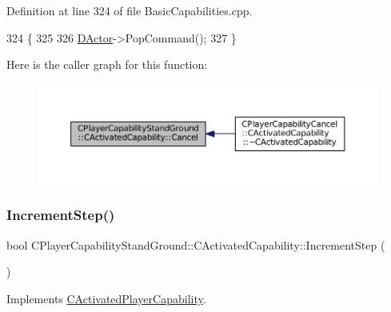Definition at line 324 of file Basic\+Capabilities.\+cpp.


\begin{DoxyCode}
324                                                              \{
325 
326     \hyperlink{classCActivatedPlayerCapability_a54ca944b47bff2718330639941d402b0}{DActor}->PopCommand();
327 \}
\end{DoxyCode}
Here is the caller graph for this function\+:
\nopagebreak
\begin{figure}[H]
\begin{center}
\leavevmode
\includegraphics[width=350pt]{classCPlayerCapabilityStandGround_1_1CActivatedCapability_ac75cd8a26726adb60cf045f99059ca7d_icgraph}
\end{center}
\end{figure}
\hypertarget{classCPlayerCapabilityStandGround_1_1CActivatedCapability_ab4061171835e4c1008176e5765ded595}{}\label{classCPlayerCapabilityStandGround_1_1CActivatedCapability_ab4061171835e4c1008176e5765ded595} 
\subsubsection{\texorpdfstring{Increment\+Step()}{IncrementStep()}}
{\footnotesize\ttfamily bool C\+Player\+Capability\+Stand\+Ground\+::\+C\+Activated\+Capability\+::\+Increment\+Step (\begin{DoxyParamCaption}{ }\end{DoxyParamCaption})\hspace{0.3cm}{\ttfamily [virtual]}}



Implements \hyperlink{classCActivatedPlayerCapability_a943b5999a57504399293250382c0ec6a}{C\+Activated\+Player\+Capability}.



